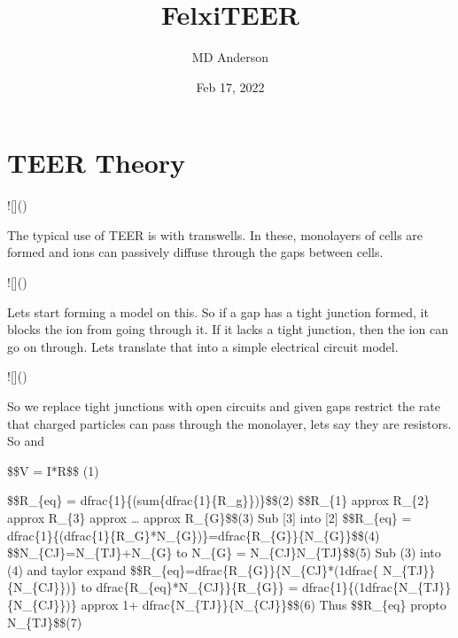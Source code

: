 \documentclass[letterpaper,10pt,english]{sphinxmanual}
\title{Felxi\sphinxhyphen{}TEER}
\date{Feb 17, 2022}
\author{MD Anderson}
\begin{document}
\pagestyle{empty}
\sphinxmaketitle
\pagestyle{plain}
\sphinxtableofcontents
\pagestyle{normal}
\label{\detokenize{index::doc}}



\chapter{TEER Theory}
\label{\detokenize{pages/TEER-Theory:teer-theory}}\label{\detokenize{pages/TEER-Theory::doc}}
\sphinxAtStartPar
!{[}{]}()

\sphinxAtStartPar
The typical use of TEER is with transwells. In these, monolayers of cells are formed and ions can passively diffuse through the gaps between cells.

\sphinxAtStartPar
!{[}{]}()

\sphinxAtStartPar
Lets start forming a model on this. So if a gap has a tight junction formed, it blocks the ion from going through it. If it lacks a tight junction, then the ion can go on through. Lets translate that into a simple electrical circuit model.

\sphinxAtStartPar
!{[}{]}()

\sphinxAtStartPar
So we replace tight junctions with open circuits and given gaps restrict the rate that charged particles can pass through the monolayer, lets say they are  resistors. So  and 

\sphinxAtStartPar
{}

\sphinxAtStartPar
\$\$V = I*R\$\$ (1)

\sphinxAtStartPar
\$\$R\_\{eq\} = dfrac\{1\}\{(sum\{dfrac\{1\}\{R\_g\}\})\}\$\$(2)
\$\$R\_\{1\} approx R\_\{2\} approx R\_\{3\} approx … approx R\_\{G\}\$\$(3)
Sub {[}3{]} into {[}2{]}
\$\$R\_\{eq\} = dfrac\{1\}\{(dfrac\{1\}\{R\_G\}*N\_\{G\})\}=dfrac\{R\_\{G\}\}\{N\_\{G\}\}\$\$(4)
\$\$N\_\{CJ\}=N\_\{TJ\}+N\_\{G\} to N\_\{G\} = N\_\{CJ\}\sphinxhyphen{}N\_\{TJ\}\$\$(5)
Sub (3) into (4) and taylor expand
\$\$R\_\{eq\}=dfrac\{R\_\{G\}\}\{N\_\{CJ\}*(1\sphinxhyphen{}dfrac\{ N\_\{TJ\}\} \{N\_\{CJ\}\})\} to dfrac\{R\_\{eq\}*N\_\{CJ\}\}\{R\_\{G\}\}
= dfrac\{1\}\{(1\sphinxhyphen{}dfrac\{N\_\{TJ\}\}\{N\_\{CJ\}\})\} approx 1+ dfrac\{N\_\{TJ\}\}\{N\_\{CJ\}\}\$\$(6)
Thus
\$\$R\_\{eq\} propto N\_\{TJ\}\$\$(7)
\end{document}

